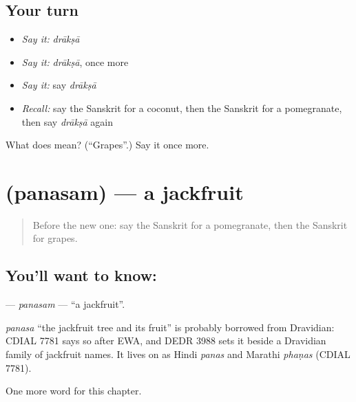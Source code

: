\subsection*{Your turn}
\begin{itemize}
\raggedright
  \item \emph{Say it:} \emph{drākṣā}
  \item \emph{Say it:} \emph{drākṣā}, once more
  \item \emph{Say it:} say \emph{drākṣā}
  \item \emph{Recall:} say the Sanskrit for a coconut, then the Sanskrit for a pomegranate, then say \emph{drākṣā} again
\end{itemize}

\begin{tcolorbox}[breakable,colback=teal!4,colframe=teal!35!black,title={Before you move on}]
What does  mean? (\textquotedblleft{}Grapes\textquotedblright{}.) Say it once more.
\end{tcolorbox}
\section[\texorpdfstring{\sk{पनसम्} (panasam)}{पनसम् (panasam)}]{ (panasam) — a jackfruit}

\label{lesson:SA-C109-panasam}



\begin{quote}
Before the new one: say the Sanskrit for a pomegranate, then the Sanskrit for grapes.
\end{quote}

\subsection*{You'll want to know: }
\textbf{} — \emph{panasam} — \textquotedblleft{}a jackfruit\textquotedblright{}.

\begin{cousinweb}
\emph{panasa} \textquotedblleft{}the jackfruit tree and its fruit\textquotedblright{} is probably borrowed from Dravidian: CDIAL 7781 says so after EWA, and DEDR 3988 sets it beside a Dravidian family of jackfruit names. It lives on as Hindi \emph{panas} and Marathi \emph{phaṇas} (CDIAL 7781).
\end{cousinweb}

\begin{grammarlens}[title={What you've built}]
One more word for this chapter.
\end{grammarlens}

